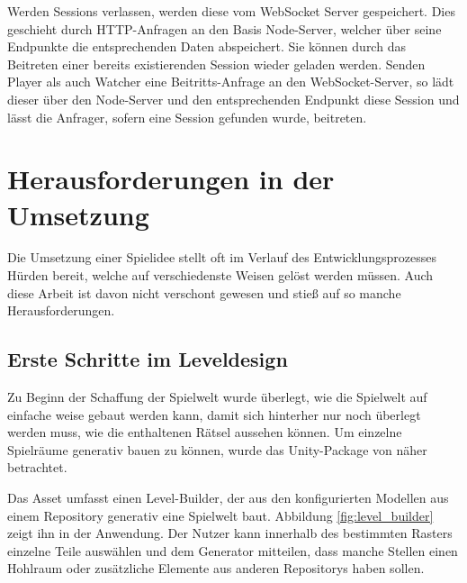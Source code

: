 Werden Sessions verlassen, werden diese vom WebSocket Server gespeichert. Dies geschieht durch \ac{HTTP}-Anfragen an den Basis Node-Server, welcher über seine Endpunkte die entsprechenden Daten abspeichert. Sie können durch das Beitreten einer bereits existierenden Session wieder geladen werden. Senden Player als auch Watcher eine Beitritts-Anfrage an den WebSocket-Server, so lädt dieser über den Node-Server und den entsprechenden Endpunkt diese Session und lässt die Anfrager, sofern eine Session gefunden wurde, beitreten.


\section{Herausforderungen in der Umsetzung}\label{sec:difficulties}
Die Umsetzung einer Spielidee stellt oft im Verlauf des Entwicklungsprozesses Hürden bereit, welche auf verschiedenste Weisen gelöst werden müssen. Auch  diese Arbeit ist davon nicht verschont gewesen und stieß auf so manche Herausforderungen. 

\subsection{Erste Schritte im Leveldesign}
Zu Beginn der Schaffung der Spielwelt wurde überlegt, wie die Spielwelt auf einfache weise gebaut werden kann, damit sich hinterher nur noch überlegt werden muss, wie die enthaltenen Rätsel aussehen können. Um einzelne Spielräume generativ bauen zu können, wurde das Unity-Package von \cite{alasl_autolevel_nodate} näher betrachtet.

Das Asset umfasst einen Level-Builder, der aus den konfigurierten Modellen aus einem Repository generativ eine Spielwelt baut. Abbildung \ref{fig:level_builder} zeigt ihn in der Anwendung. Der Nutzer kann innerhalb des bestimmten Rasters einzelne Teile auswählen und dem Generator mitteilen, dass manche Stellen einen Hohlraum oder zusätzliche Elemente aus anderen Repositorys haben sollen.

